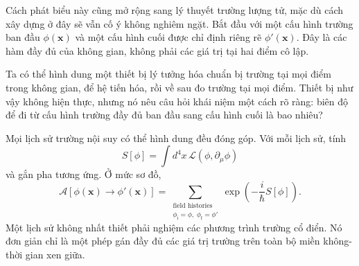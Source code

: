 Cách phát biểu này cũng mở rộng sang lý thuyết trường lượng tử, mặc dù cách xây dựng ở đây sẽ vẫn cố ý không nghiêm ngặt. Bắt đầu với một cấu hình trường ban đầu \(\phi(\mathbf{x})\) và một cấu hình cuối được chỉ định riêng rẽ \(\phi'(\mathbf{x})\). Đây là các hàm đầy đủ của không gian, không phải các giá trị tại hai điểm cô lập.

Ta có thể hình dung một thiết bị lý tưởng hóa chuẩn bị trường tại mọi điểm trong không gian, để hệ tiến hóa, rồi về sau đo trường tại mọi điểm. Thiết bị như vậy không hiện thực, nhưng nó nêu câu hỏi khái niệm một cách rõ ràng: biên độ để đi từ cấu hình trường đầy đủ ban đầu sang cấu hình cuối là bao nhiêu?

Mọi lịch sử trường nội suy có thể hình dung đều đóng góp. Với mỗi lịch sử, tính
\begin{equation}
S[\phi]=\int d^4x\,\mathcal{L}(\phi,\partial_\mu\phi)
\end{equation}
và gắn pha tương ứng. Ở mức sơ đồ,
\begin{equation}
\mathcal{A}\!\left[\phi(\mathbf{x})\rightarrow\phi'(\mathbf{x})\right]
=
\sum_{\substack{\text{field histories}\\
\phi_{\mathrm{i}}=\phi,\;\phi_{\mathrm{f}}=\phi'}}
\exp\!\left(-\frac{i}{\hbar}S[\phi]\right).
\end{equation}
Một lịch sử không nhất thiết phải nghiệm các phương trình trường cổ điển. Nó đơn giản chỉ là một phép gán đầy đủ các giá trị trường trên toàn bộ miền không-thời gian xen giữa.

\begin{classroomqa}
\end{classroomqa}


